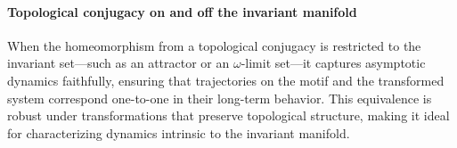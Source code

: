 \documentclass{article}
\theoremstyle{definition} \newtheorem{definition}{Definition}  \newtheorem{example}{Example}
\theoremstyle{remark} \newtheorem{remark}{Remark}
\newcounter{ct}
\newcommand{\field}[1]{\ensuremath{\mathbb{#1}}}
\newcommand{\reals}{\field{R}}
\begin{document}




\paragraph{Topological conjugacy on and off the invariant manifold}
When the homeomorphism from a topological conjugacy is restricted to the invariant set---such as an attractor or an $\omega$-limit set---it captures asymptotic dynamics faithfully, ensuring that trajectories on the motif and the transformed system correspond one-to-one in their long-term behavior.
 This equivalence is robust under transformations that preserve topological structure, making it ideal for characterizing dynamics intrinsic to the invariant manifold.
 
\end{document}

